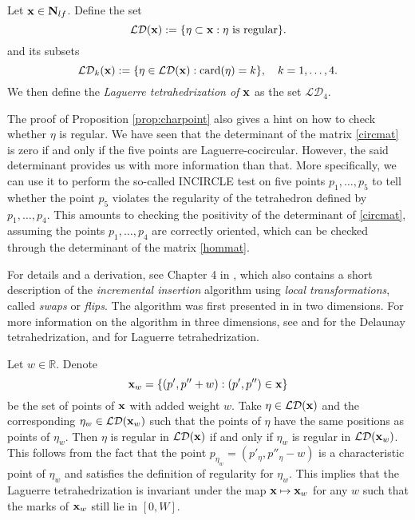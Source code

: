 \begin{definition}
	Let ${\mathbf{x}} \in \mathbf N_{lf}$. Define the set 
	$$\mathcal {LD}({\mathbf{x}}) := \{\eta\subset {\mathbf{x}}: \eta \text{ is regular}\}.$$
	and its subsets
	$$\mathcal {LD}_k({\mathbf{x}}) := \{\eta \in \mathcal {LD}({\mathbf{x}}): \mathrm{card}(\eta)=k \},\quad k = 1,\dots,4.$$
	We then define the \textit{Laguerre tetrahedrization of ${\mathbf{x}}$} as the set $\mathcal {LD}_4$. 
\end{definition}



\begin{remark}\label{r:construct}
	The proof of Proposition \ref{prop:charpoint} also gives a hint on how to check whether $\eta$ is regular. We have seen that the determinant of the matrix \eqref{circmat} is zero if and only if the five points are Laguerre-cocircular. However, the said determinant provides us with more information than that. More specifically, we can use it to perform the so-called INCIRCLE test on five points $p_1,\dots, p_5$ to tell whether the point $p_5$ violates the regularity of the tetrahedron defined by $p_1,\dots, p_4$. This amounts to checking the positivity of the determinant of \eqref{circmat}, assuming the points $p_1,\dots, p_4$ are correctly oriented, which can be checked through the determinant of the matrix \eqref{hommat}. \newline
	
	For details and a derivation, see Chapter 4 in \cite{Gavrilova}, which also contains a short description of the \textit{incremental insertion} algorithm using \textit{local transformations}, called \textit{swaps} or \textit{flips}. The algorithm was first presented in \cite{Lawson72} in two dimensions. For more information on the algorithm in three dimensions, see \cite{Joe89} and \cite{Joe91} for the Delaunay tetrahedrization, and \cite{Edelsbrunner1996} for Laguerre tetrahedrization.
\end{remark}



\begin{remark}\label{rem:invariance}
	Let $w\in \mathbb R$. Denote 
	$${\mathbf{x}}_w = \{(p',p''+w): (p',p'')\in{\mathbf{x}}\}$$ be the set of points of ${\mathbf{x}}$ with added weight $w$. Take $\eta \in \mathcal {LD}({\mathbf{x}})$ and the corresponding $\eta_w \in \mathcal {LD}({\mathbf{x}}_w)$ such that the points of $\eta$ have the same positions as points of $\eta_w$. Then $\eta$ is regular in $\mathcal {LD}({\mathbf{x}})$ if and only if $\eta_w$ is  regular in $\mathcal {LD}({\mathbf{x}}_w)$. This follows from the fact that the point $p_{\eta_w} = (p'_{\eta}, p''_{\eta} -w)$ is a characteristic point of $\eta_w$ and satisfies the definition of regularity for $\eta_w$. This implies that the Laguerre tetrahedrization is invariant under the map ${\mathbf{x}} \mapsto {\mathbf{x}}_w$ for any $w$ such that the marks of ${\mathbf{x}}_w$ still lie in $[0,W]$.
\end{remark}

